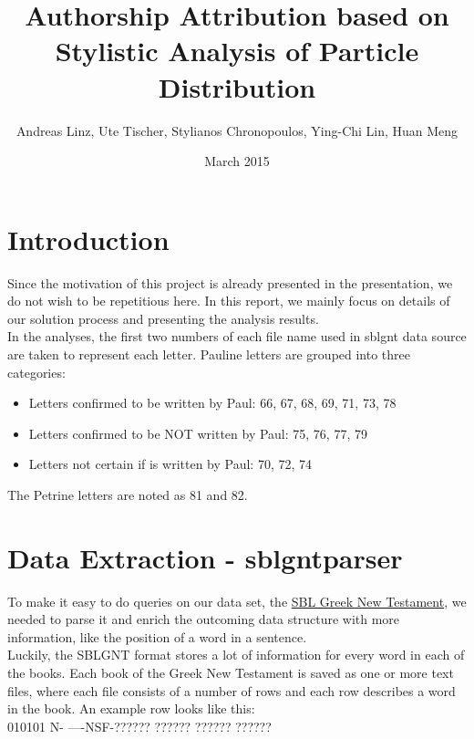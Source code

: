 \documentclass[a4paper]{article}
\begin{document}
\title{Authorship Attribution based on Stylistic Analysis of Particle Distribution}
\author{Andreas Linz, Ute Tischer, Stylianos Chronopoulos, Ying-Chi Lin, Huan Meng}
\date{March 2015}
\maketitle

\section{Introduction}
Since the motivation of this project is already presented in the presentation, we do not wish to be repetitious here. In this report, we mainly focus on details of our solution process and presenting the analysis results. \\

In the analyses, the first two numbers of each file name used in sblgnt data source are taken to represent each letter. Pauline letters are grouped into three categories: \\
\begin{itemize}
\item Letters confirmed to be written by Paul: 66, 67, 68, 69, 71, 73, 78 
\item Letters confirmed to be NOT written by Paul: 75, 76, 77, 79 
\item Letters not certain if is written by Paul: 70, 72, 74
\end{itemize}

The Petrine letters are noted as 81 and 82. \\

\section{Data Extraction - sblgntparser}
To make it easy to do queries on our data set, the \href{https://github.com/morphgnt/sblgnt}{SBL Greek New Testament}, we needed to parse it and enrich the outcoming data structure with more information, like the position of a word in a sentence. \\
Luckily, the SBLGNT format stores a lot of information for every word in each of the books. Each book of the Greek New Testament is saved as one or more text files, where each file consists of a number of rows and each row describes a word in the book. An example row looks like this: \\

010101 N- ----NSF-\textgreek{?????? ?????? ?????? ??????}
\end{document}
